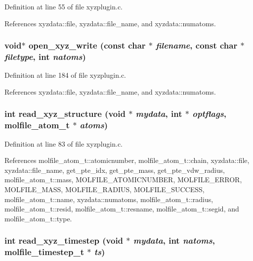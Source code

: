 Definition at line 55 of file xyzplugin.c.

References xyzdata::file, xyzdata::file\_\-name, and xyzdata::numatoms.
\subsubsection{\setlength{\rightskip}{0pt plus 5cm}void$\ast$ open\_\-xyz\_\-write (const char $\ast$ {\em filename}, const char $\ast$ {\em filetype}, int {\em natoms})\hspace{0.3cm}{\tt  [static]}}\label{xyzplugin_8c_a5}




Definition at line 184 of file xyzplugin.c.

References xyzdata::file, xyzdata::file\_\-name, and xyzdata::numatoms.
\subsubsection{\setlength{\rightskip}{0pt plus 5cm}int read\_\-xyz\_\-structure (void $\ast$ {\em mydata}, int $\ast$ {\em optflags}, {\bf molfile\_\-atom\_\-t} $\ast$ {\em atoms})\hspace{0.3cm}{\tt  [static]}}\label{xyzplugin_8c_a2}




Definition at line 83 of file xyzplugin.c.

References molfile\_\-atom\_\-t::atomicnumber, molfile\_\-atom\_\-t::chain, xyzdata::file, xyzdata::file\_\-name, get\_\-pte\_\-idx, get\_\-pte\_\-mass, get\_\-pte\_\-vdw\_\-radius, molfile\_\-atom\_\-t::mass, MOLFILE\_\-ATOMICNUMBER, MOLFILE\_\-ERROR, MOLFILE\_\-MASS, MOLFILE\_\-RADIUS, MOLFILE\_\-SUCCESS, molfile\_\-atom\_\-t::name, xyzdata::numatoms, molfile\_\-atom\_\-t::radius, molfile\_\-atom\_\-t::resid, molfile\_\-atom\_\-t::resname, molfile\_\-atom\_\-t::segid, and molfile\_\-atom\_\-t::type.
\subsubsection{\setlength{\rightskip}{0pt plus 5cm}int read\_\-xyz\_\-timestep (void $\ast$ {\em mydata}, int {\em natoms}, {\bf molfile\_\-timestep\_\-t} $\ast$ {\em ts})\hspace{0.3cm}{\tt  [static]}}\label{xyzplugin_8c_a3}




